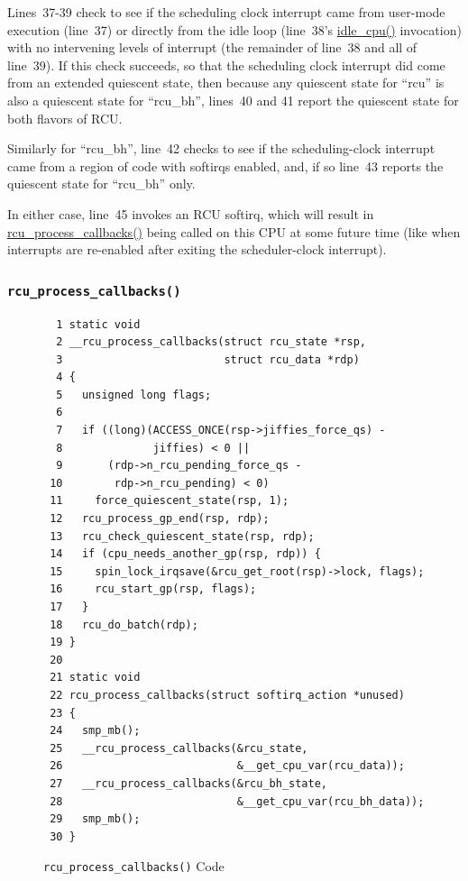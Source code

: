 Lines~37-39 check to see if the scheduling clock interrupt came
from user-mode execution (line~37) or directly from the idle
loop (line~38's \url{idle_cpu()} invocation) with no intervening
levels of interrupt (the remainder of line~38 and all of line~39).
If this check succeeds, so that the scheduling clock interrupt
did come from an extended quiescent state, then
because any quiescent state for ``rcu'' is also a quiescent state
for ``rcu\_bh'', lines~40 and 41 report the quiescent state for
both flavors of RCU.

Similarly for ``rcu\_bh'', line~42 checks to see if the scheduling-clock
interrupt came from a region of code with softirqs enabled, and, if so
line~43 reports the quiescent state for ``rcu\_bh'' only.

 \QuickQuizEnd

In either case, line~45 invokes an RCU softirq, which will result in
\url{rcu_process_callbacks()} being called on this CPU at some future
time (like when interrupts are re-enabled after exiting the
scheduler-clock interrupt).

\subsubsection{\tt rcu\_process\_callbacks()}
\label{app:rcuimpl:rcutreewt:rcu-process-callbacks}

\begin{figure}[tbp]
{ \scriptsize
\begin{verbatim}
  1 static void
  2 __rcu_process_callbacks(struct rcu_state *rsp,
  3                         struct rcu_data *rdp)
  4 {
  5   unsigned long flags;
  6 
  7   if ((long)(ACCESS_ONCE(rsp->jiffies_force_qs) -
  8              jiffies) < 0 ||
  9       (rdp->n_rcu_pending_force_qs -
 10        rdp->n_rcu_pending) < 0)
 11     force_quiescent_state(rsp, 1);
 12   rcu_process_gp_end(rsp, rdp);
 13   rcu_check_quiescent_state(rsp, rdp);
 14   if (cpu_needs_another_gp(rsp, rdp)) {
 15     spin_lock_irqsave(&rcu_get_root(rsp)->lock, flags);
 16     rcu_start_gp(rsp, flags);
 17   }
 18   rcu_do_batch(rdp);
 19 }
 20 
 21 static void
 22 rcu_process_callbacks(struct softirq_action *unused)
 23 {
 24   smp_mb();
 25   __rcu_process_callbacks(&rcu_state,
 26                           &__get_cpu_var(rcu_data));
 27   __rcu_process_callbacks(&rcu_bh_state,
 28                           &__get_cpu_var(rcu_bh_data));
 29   smp_mb();
 30 }
\end{verbatim}
}
\caption{{\tt rcu\_process\_callbacks()} Code}
\label{fig:app:rcuimpl:rcutreewt:Code for rcutree rcu-process-callbacks}
\end{figure}

